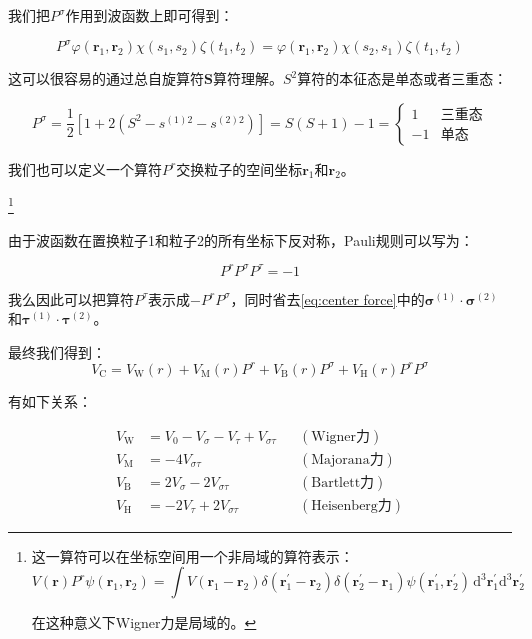 我们把$P^{\sigma}$作用到波函数上即可得到：

\[
P^{\sigma}\varphi(\boldsymbol{r}_{1},\boldsymbol{r}_{2})\chi(s_{1},s_{2})\zeta(t_{1},t_{2})=\varphi(\boldsymbol{r}_{1},\boldsymbol{r}_{2})\chi(s_{2},s_{1})\zeta(t_{1},t_{2})
\]

这可以很容易的通过总自旋算符$\boldsymbol{S}$算符理解。$S^{2}$算符的本征态是单态或者三重态：

\[
P^{\sigma}=\frac{1}{2}[1+2(S^{2}-s^{(1)2}-s^{(2)2})]=S(S+1)-1=\begin{cases}
1 & \text{三重态}\\
-1 & \text{单态 }
\end{cases}
\]

我们也可以定义一个算符$P^{r}$交换粒子的空间坐标$\boldsymbol{r}_{1}$和$\boldsymbol{r}_{2}$。

\footnote{这一算符可以在坐标空间用一个非局域的算符表示：
\[
V(\boldsymbol{r})P^{r}\psi(\boldsymbol{r}_{1},\boldsymbol{r}_{2})=\int V(\boldsymbol{r}_{1}-\boldsymbol{r}_{2})\delta(\boldsymbol{r}^{\prime}_{1}-\boldsymbol{r}_{2})\delta(\boldsymbol{r}^{\prime}_{2}-\boldsymbol{r}_{1})\psi(\boldsymbol{r}^{\prime}_{1},\boldsymbol{r}^{\prime}_{2})\,\mathrm{d}^{3}\boldsymbol{r}^{\prime}_{1}\mathrm{d}^{3}\boldsymbol{r}^{\prime}_{2}
\]

在这种意义下Wigner力是局域的。}

由于波函数在置换粒子1和粒子2的所有坐标下反对称，Pauli规则可以写为：

\[
P^{r}P^{\sigma}P^{\tau}=-1
\]

我么因此可以把算符$P^{\tau}$表示成$-P^{r}P^{\sigma}$，同时省去\ref{eq:center force}中的$\boldsymbol{\sigma}^{(1)}\cdot\boldsymbol{\sigma}^{(2)}$和$\boldsymbol{\tau}^{(1)}\cdot\boldsymbol{\tau}^{(2)}$。

最终我们得到：
\[
V_{\text{C}}=V_{\text{W}}(r)+V_{\text{M}}(r)P^{r}+V_{\text{B}}(r)P^{\sigma}+V_{\text{H}}(r)P^{r}P^{\sigma}
\]

有如下关系：

\begin{align*}
V_{\text{W}} & =V_{0}-V_{\sigma}-V_{\tau}+V_{\sigma\tau} &  & (\text{Wigner力})\\
V_{\text{M}} & =-4V_{\sigma\tau} &  & (\text{Majorana力})\\
V_{\text{B}} & =2V_{\sigma}-2V_{\sigma\tau} &  & (\text{Bartlett力})\\
V_{\text{H}} & =-2V_{\tau}+2V_{\sigma\tau} &  & (\text{Heisenberg力})
\end{align*}

